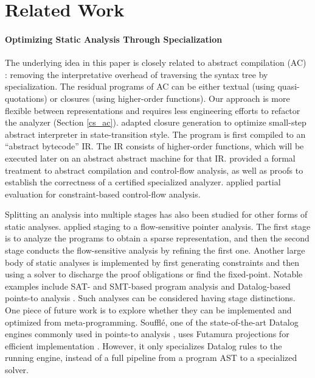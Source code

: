 \section{Related Work}

\paragraph{Optimizing Static Analysis Through Specialization} The underlying
idea in this paper is closely related to abstract compilation (AC)
\cite{Boucher:1996:ACN:647473.727587}: removing the interpretative overhead of
traversing the syntax tree by specialization. The residual programs of AC can
be either textual (using quasi-quotations) or closures (using higher-order
functions).  Our approach is more flexible between representations and requires
less engineering efforts to refactor the analyzer (Section \ref{cs_ac}).
\citet{Johnson:2013:OAA:2500365.2500604} adapted closure generation to optimize
small-step abstract interpreter in state-transition style. The program
is first compiled to an ``abstract bytecode'' IR. The IR consists of higher-order
functions, which will be executed later on an abstract abstract machine for
that IR.  \citet{damian1999partial} provided a formal treatment to abstract
compilation and control-flow analysis, as well as proofs to establish the
correctness of a certified specialized analyzer.  \citet{amtoft1999partial}
applied partial evaluation for constraint-based control-flow analysis.

Splitting an analysis into multiple stages has also been studied for other
forms of static analyses.
\citet{DBLP:conf/cgo/HardekopfL11} applied staging to a
flow-sensitive pointer analysis. The first stage is to analyze the
programs to obtain a sparse representation, and then the second
stage conducts the flow-sensitive analysis by refining the first
one. Another large body of static analyses is implemented by
first generating constraints and then using a solver to discharge the
proof obligations or find the fixed-point. Notable examples include
SAT- and SMT-based program analysis
\cite{Gulwani:2008:PAC:1375581.1375616} and Datalog-based points-to
analysis \cite{Smaragdakis:2015:PA:2802194.2802195}.
Such analyses can be considered having stage distinctions.  One piece of future
work is to explore whether they can be implemented and optimized from
meta-programming.
Souffl{\'e}, one of the state-of-the-art Datalog engines commonly used in
points-to analysis \cite{Antoniadis:2017:PDS:3088515.3088522}, uses Futamura
projections for efficient implementation \cite{10.1007/978-3-319-41540-6_23}.
However, it only specializes Datalog rules to the running engine, instead of a
full pipeline from a program AST to a specialized solver.


